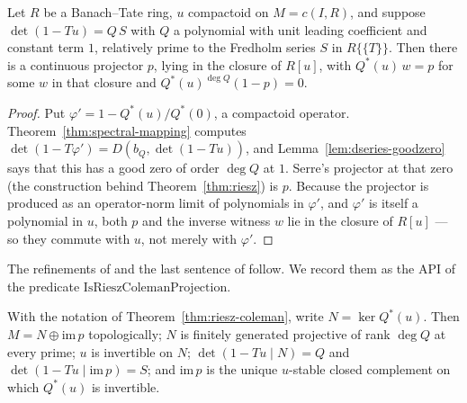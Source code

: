 \begin{theorem}
  \label{thm:riesz-coleman}
  \leanok
  Let $R$ be a Banach--Tate ring, $u$ compactoid on $M = c(I,R)$, and suppose
  $\det(1-Tu) = Q\,S$ with $Q$ a polynomial with unit leading coefficient and constant term $1$,
  relatively prime to the Fredholm series $S$ in $R\{\{T\}\}$.  Then there is a continuous
  projector $p$, lying in the closure of $R[u]$, with $Q^{*}(u)\,w = p$ for some $w$ in that
  closure and $Q^{*}(u)^{\deg Q}(1-p) = 0$.
\end{theorem}

\begin{proof}
  \leanok
  Put $\varphi' = 1 - Q^{*}(u)/Q^{*}(0)$, a compactoid operator.  Theorem~\ref{thm:spectral-mapping}
  computes $\det(1 - T\varphi') = D(b_Q, \det(1-Tu))$, and Lemma~\ref{lem:dseries-goodzero}
  says that this has a good zero of order $\deg Q$ at $1$.  Serre's projector at that zero
  (the construction behind Theorem~\ref{thm:riesz}) is $p$.  Because the projector is produced
  as an operator-norm limit of polynomials in $\varphi'$, and $\varphi'$ is itself a polynomial
  in $u$, both $p$ and the inverse witness $w$ lie in the closure of $R[u]$ --- so they commute
  with $u$, not merely with $\varphi'$.
\end{proof}

The refinements of \cite[Proposition 3.2 and Theorem 3.3]{Buzzard} and the last sentence of
\cite[Theorem 2.2.2]{JN} follow.  We record them as the API of the predicate
$\mathrm{IsRieszColemanProjection}$.

\begin{theorem}
  \label{thm:riesz-coleman-full}
  \leanok
  With the notation of Theorem~\ref{thm:riesz-coleman}, write $N = \ker Q^{*}(u)$.  Then
  $M = N \oplus \mathrm{im}\,p$ topologically; $N$ is finitely generated projective of rank
  $\deg Q$ at every prime; $u$ is invertible on $N$; $\det(1-Tu \mid N) = Q$ and
  $\det(1-Tu\mid \mathrm{im}\,p) = S$; and $\mathrm{im}\,p$ is the unique $u$-stable closed
  complement on which $Q^{*}(u)$ is invertible.
\end{theorem}

